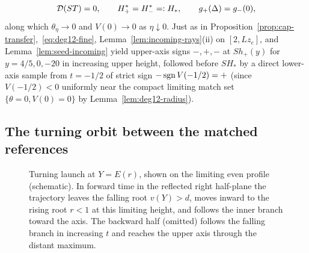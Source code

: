 \begin{equation}\label{eq:deg12-3matches}
  \mathcal{D}(ST)=0,\qquad H_+^*=H_-^*=:H_*,\qquad g_+(\Delta)=g_-(0),
\end{equation}
along which $\theta_\eta\to 0$ and $V(0)\to 0$ as $\eta\downarrow 0$. Just as in Proposition~\ref{prop:cap-transfer},~\eqref{eq:deg12-fine}, Lemma~\ref{lem:incoming-rays}(ii) on $[2,Lz_e]$, and Lemma~\ref{lem:seed-incoming} yield upper-axis signs $-,+,-$ at $S h_+(y)$ for $y=4/5,0,-20$ in increasing upper height, followed before $SH_*$ by a direct lower-axis sample from $t=-1/2$ of strict sign $-\operatorname{sgn} V(-1/2)=+$ (since $V(-1/2)<0$ uniformly near the compact limiting match set $\{\theta=0,V(0)=0\}$ by Lemma~\ref{lem:deg12-radius}).

\subsection{The turning orbit between the matched references}\label{subsec:deg12-finish}
\begin{figure}[htbp]
\centering
{}
\caption{Turning launch at $Y=E(r)$, shown on the limiting even profile
(schematic). In forward time in the reflected right half-plane the
trajectory leaves the falling root $v(Y)>d$, moves inward to the rising
root $r<1$ at this limiting height, and follows the inner branch toward
the axis. The backward half (omitted) follows the falling branch in
increasing $t$ and reaches the upper axis through the distant maximum.}\label{fig:turning-supp}
\end{figure}

